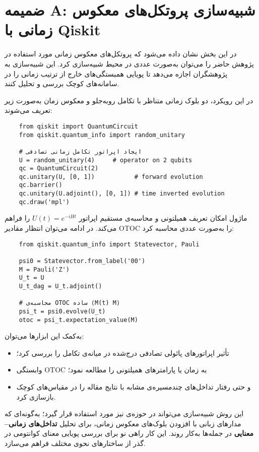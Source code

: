 \appendix
\section*{ضمیمه A: شبیه‌سازی پروتکل‌های معکوس زمانی با Qiskit}
\label{sec:qiskit-appendix}

در این بخش نشان داده می‌شود که پروتکل‌های معکوس زمانی مورد استفاده در پژوهش حاضر را می‌توان به‌صورت عددی در محیط  شبیه‌سازی کرد. این شبیه‌سازی به پژوهشگران اجازه می‌دهد تا پویایی همبستگی‌های خارج از ترتیب زمانی را در سامانه‌های کوچک بررسی و تحلیل کنند.

در این رویکرد، دو بلوک زمانی متناظر با تکامل روبه‌جلو و معکوس زمان به‌صورت زیر تعریف می‌شوند:

\begin{verbatim}
	from qiskit import QuantumCircuit
	from qiskit.quantum_info import random_unitary
	
	# ایجاد اپراتور تکامل زمانی تصادفی
	U = random_unitary(4)     # operator on 2 qubits
	qc = QuantumCircuit(2)
	qc.unitary(U, [0, 1])           # forward evolution
	qc.barrier()
	qc.unitary(U.adjoint(), [0, 1]) # time inverted evolution
	qc.draw('mpl')
\end{verbatim}

ماژول  امکان تعریف همیلتونی و محاسبه‌ی مستقیم اپراتور \( U(t)=e^{-iHt} \) را فراهم می‌کند.  
در ادامه می‌توان انتظار مقادیر OTOC را به‌صورت عددی محاسبه کرد:

\begin{verbatim}
	from qiskit.quantum_info import Statevector, Pauli
	
	psi0 = Statevector.from_label('00')
	M = Pauli('Z')
	U_t = U
	U_t_dag = U_t.adjoint()
	
	# محاسبه‌ی OTOC ساده ⟨M(t) M⟩
	psi_t = psi0.evolve(U_t)
	otoc = psi_t.expectation_value(M)
\end{verbatim}

به‌کمک این ابزارها می‌توان:
\begin{itemize}
	\item تأثیر اپراتورهای پائولی تصادفی درج‌شده در میانه‌ی تکامل را بررسی کرد؛
	\item وابستگی OTOC به زمان یا پارامترهای همیلتونی را مطالعه نمود؛
	\item و حتی رفتار تداخل‌های چندمسیره‌ی مشابه با نتایج مقاله را در مقیاس‌های کوچک بازسازی کرد.
\end{itemize}

این روش شبیه‌سازی می‌تواند در حوزه‌ی  نیز مورد استفاده قرار گیرد؛ به‌گونه‌ای که مدارهای زبانی  با افزودن بلوک‌های معکوس زمانی، برای تحلیل \textbf{تداخل‌های زمانی–معنایی} در جمله‌ها به‌کار روند. این کار راهی نو برای بررسی پویایی معنای کوانتومی در گذر از ساختارهای نحوی مختلف فراهم می‌سازد.

